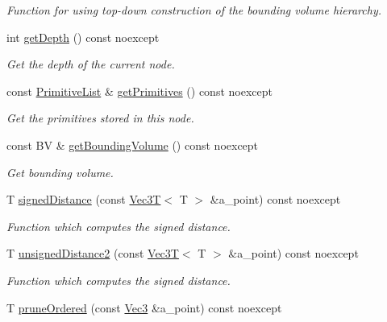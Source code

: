 \begin{DoxyCompactItemize}
\begin{DoxyCompactList}\small\item\em Function for using top-\/down construction of the bounding volume hierarchy. \end{DoxyCompactList}\item 
int \hyperlink{classBVH_1_1NodeT_a158041a671c970da921446050e95f474}{get\+Depth} () const noexcept
\begin{DoxyCompactList}\small\item\em Get the depth of the current node. \end{DoxyCompactList}\item 
const \hyperlink{classBVH_1_1NodeT_a19cce6e7fbe85eccb4a3718dd69f49b7}{Primitive\+List} \& \hyperlink{classBVH_1_1NodeT_a2e0c1e030162a2dc049acb4debd4d9f2}{get\+Primitives} () const noexcept
\begin{DoxyCompactList}\small\item\em Get the primitives stored in this node. \end{DoxyCompactList}\item 
\mbox{\label{classBVH_1_1NodeT_a02cba4dcb065ebfaeea7e4d251b89d04}} 
const BV \& \hyperlink{classBVH_1_1NodeT_a02cba4dcb065ebfaeea7e4d251b89d04}{get\+Bounding\+Volume} () const noexcept
\begin{DoxyCompactList}\small\item\em Get bounding volume. \end{DoxyCompactList}\item 
T \hyperlink{classBVH_1_1NodeT_a0fe074fbff56ac2d0a6ad113ed34d56b}{signed\+Distance} (const \hyperlink{classVec3T}{Vec3T}$<$ T $>$ \&a\+\_\+point) const noexcept
\begin{DoxyCompactList}\small\item\em Function which computes the signed distance. \end{DoxyCompactList}\item 
T \hyperlink{classBVH_1_1NodeT_a9b2e3a1a296cc3f9f8de488755217432}{unsigned\+Distance2} (const \hyperlink{classVec3T}{Vec3T}$<$ T $>$ \&a\+\_\+point) const noexcept
\begin{DoxyCompactList}\small\item\em Function which computes the signed distance. \end{DoxyCompactList}\item 
T \hyperlink{classBVH_1_1NodeT_a3aa6e9109897a573a46714278e0a79c6}{prune\+Ordered} (const \hyperlink{classBVH_1_1NodeT_a6fbb4308c5c55ee170c5f992df7ae1d0}{Vec3} \&a\+\_\+point) const noexcept

\end{DoxyCompactItemize}
